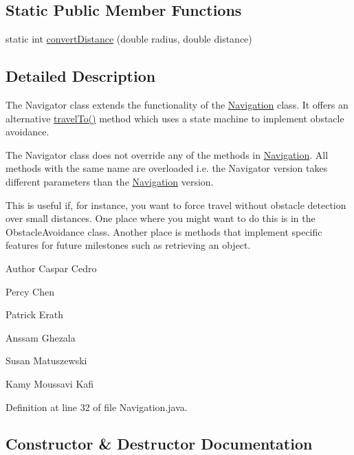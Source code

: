 \subsection*{Static Public Member Functions}
\begin{DoxyCompactItemize}
\item 
static int \hyperlink{classca_1_1mcgill_1_1ecse211_1_1project_1_1_navigation_ac9e260bcd619ffa4820d7d0de7ea1c12}{convert\+Distance} (double radius, double distance)
\end{DoxyCompactItemize}


\subsection{Detailed Description}
The Navigator class extends the functionality of the \hyperlink{classca_1_1mcgill_1_1ecse211_1_1project_1_1_navigation}{Navigation} class. It offers an alternative \hyperlink{classca_1_1mcgill_1_1ecse211_1_1project_1_1_navigation_ad89b3dd084d81b4ec4d89ea73ba13eaa}{travel\+To()} method which uses a state machine to implement obstacle avoidance.

The Navigator class does not override any of the methods in \hyperlink{classca_1_1mcgill_1_1ecse211_1_1project_1_1_navigation}{Navigation}. All methods with the same name are overloaded i.\+e. the Navigator version takes different parameters than the \hyperlink{classca_1_1mcgill_1_1ecse211_1_1project_1_1_navigation}{Navigation} version.

This is useful if, for instance, you want to force travel without obstacle detection over small distances. One place where you might want to do this is in the Obstacle\+Avoidance class. Another place is methods that implement specific features for future milestones such as retrieving an object.

\begin{DoxyAuthor}{Author}
Caspar Cedro 

Percy Chen 

Patrick Erath 

Anssam Ghezala 

Susan Matuszewski 

Kamy Moussavi Kafi 
\end{DoxyAuthor}


Definition at line 32 of file Navigation.\+java.



\subsection{Constructor \& Destructor Documentation}
\mbox{\label{classca_1_1mcgill_1_1ecse211_1_1project_1_1_navigation_aaee14b67c392ddd951e3ce21224c3e56}} 
